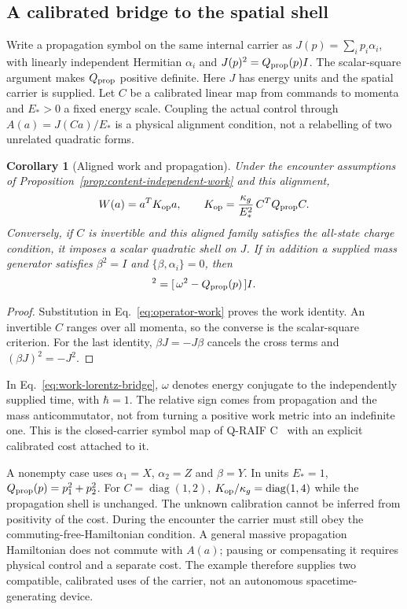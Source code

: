 \documentclass[aps,pre,onecolumn,superscriptaddress,floatfix,longbibliography]{revtex4-2}
\newtheorem{corollary}[theorem]{Corollary}
\begin{document}
\subsection{A calibrated bridge to the spatial shell}

Write a propagation symbol on the same internal carrier as
$J(p)=\sum_i p_i\alpha_i$, with linearly independent Hermitian $\alpha_i$
and $J(p)^2=Q_{\rm prop}(p)I$. The scalar-square argument makes
$Q_{\rm prop}$ positive definite.
Here $J$ has energy units and the spatial carrier is supplied.
Let $C$ be a calibrated linear map from commands to momenta and $E_*>0$
a fixed energy scale. Coupling the actual control through
$A(a)=J(Ca)/E_*$ is a physical alignment condition, not a relabelling
of two unrelated quadratic forms.

\begin{corollary}[Aligned work and propagation]
\label{cor:aligned-cost-shell}
Under the encounter assumptions of
Proposition~\ref{prop:content-independent-work} and this alignment,
\begin{equation}
 W(a)=a^T K_{\rm op}a,\qquad
 K_{\rm op}=\frac{\kappa_g}{E_*^2}\,C^TQ_{\rm prop}C.
 \label{eq:aligned-work-shell}
\end{equation}
Conversely, if $C$ is invertible and this aligned family satisfies the
all-state charge condition, it imposes a scalar quadratic shell on $J$.
If in addition a supplied mass generator satisfies
$\beta^2=I$ and $\{\beta,\alpha_i\}=0$, then
\begin{equation}
 [\,\omega\beta-\beta J(p)\,]^2
   =[\,\omega^2-Q_{\rm prop}(p)\,]I.
 \label{eq:work-lorentz-bridge}
\end{equation}
\end{corollary}
\begin{proof}
Substitution in Eq.~\eqref{eq:operator-work} proves the work identity.
An invertible $C$ ranges over all momenta, so the converse is the
scalar-square criterion. For the last identity, $\beta J=-J\beta$
cancels the cross terms and $(\beta J)^2=-J^2$.
\end{proof}

In Eq.~\eqref{eq:work-lorentz-bridge}, $\omega$ denotes energy
conjugate to the independently supplied time, with $\hbar=1$.
The relative sign comes from propagation and the mass anticommutator,
not from turning a positive work metric into an indefinite one.
This is the closed-carrier symbol map of Q-RAIF C~\cite{Liu2026QRAIF_C}
with an explicit calibrated cost attached to it.

A nonempty case uses $\alpha_1=X$, $\alpha_2=Z$ and $\beta=Y$.
In units $E_*=1$, $Q_{\rm prop}(p)=p_1^2+p_2^2$.
For $C=\operatorname{diag}(1,2)$,
$K_{\rm op}/\kappa_g=\operatorname{diag}(1,4)$ while the propagation
shell is unchanged. The unknown calibration cannot be inferred from
positivity of the cost. During the encounter the carrier must still
obey the commuting-free-Hamiltonian condition. A general massive
propagation Hamiltonian does not commute with $A(a)$; pausing or
compensating it requires physical control and a separate cost.
The example therefore supplies two compatible, calibrated uses of the
carrier, not an autonomous spacetime-generating device.
\end{document}
